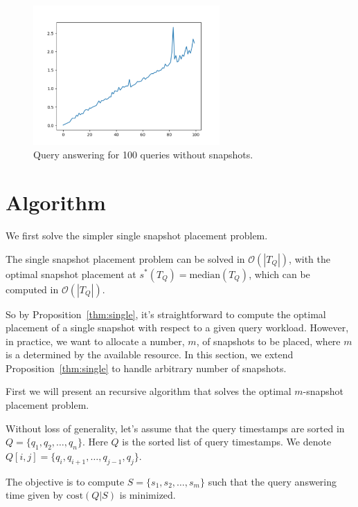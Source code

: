 \begin{figure}[tb]
    \label{fig:query-time-no-snap}
    \centering
    \includegraphics[width=2.8in]{figs/runtime.pdf}
    \caption{Query answering for 100 queries without snapshots.}
\end{figure}




\section{Algorithm}

We first solve the simpler single snapshot placement problem.

\begin{prop}
    \label{thm:single}
    The single snapshot placement problem can be solved in $\mathcal{O}(|T_Q|)$,
    with the optimal snapshot placement at
    $ s^*(T_Q) = \mathrm{median}(T_Q) $,
    which can be computed in $\mathcal{O}(|T_Q|)$.
\end{prop}


So by Proposition~\ref{thm:single}, it's straightforward to compute the optimal
placement of a single snapshot with respect to a given query workload.  However,
in practice, we want to allocate a number, $m$, of snapshots to be placed, where
$m$ is a determined by the available resource.
In this section, we extend Proposition~\ref{thm:single} to handle arbitrary number
of snapshots.

First we will present an recursive algorithm that solves the optimal
$m$-snapshot placement problem.

Without loss of generality, let's assume that  the query timestamps are sorted
in $Q = \{q_1, q_2, \dots, q_n\}$.  Here $Q$ is the sorted list of query
timestamps.  We denote $Q[i,j] = \{q_i, q_{i+1}, \dots, q_{j-1}, q_j\}$.

The objective is to compute $S = \{s_1, s_2, \dots, s_m\}$ such
that the query answering time given by $\mathrm{cost}(Q|S)$ is minimized.

